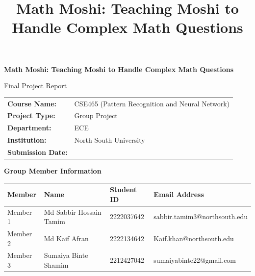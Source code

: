 \documentclass[12pt,a4paper]{article}
\title{\textbf{Math Moshi: Teaching Moshi to Handle Complex Math Questions}}
\author{}
\date{}
\begin{document}
\begin{titlepage}
\centering
{\Large \textbf{Math Moshi: Teaching Moshi to Handle Complex Math Questions}\par}
\vspace{1.2cm}

{\large Final Project Report\par}
\vspace{1cm}

\begin{tabular}{>{\bfseries}p{2.2in}p{3.8in}}
Course Name: & CSE465 (Pattern Recognition and Neural Network) \\
Project Type: & Group Project \\
Department: & ECE \\
Institution: & North South University \\
Submission Date: & \underline{\hspace{3.3in}} \\
\end{tabular}

\vspace{1.1cm}

{\large \textbf{Group Member Information}\par}
\vspace{0.4cm}

\begin{center}
\small
\begin{tabular}{|p{1.0in}|p{2.1in}|p{1.2in}|p{2.2in}|}
\hline
\textbf{Member} & \textbf{Name} & \textbf{Student ID} & \textbf{Email Address} \\
\hline
Member 1 & Md Sabbir Hossain Tamim & 2222037642 & sabbir.tamim3@northsouth.edu \\
\hline
Member 2 & Md Kaif Afran & 2222134642 & Kaif.khan@northsouth.edu \\
\hline
Member 3 & Sumaiya Binte Shamim & 2212427042 & sumaiyabinte22@gmail.com \\
\hline
\end{tabular}
\end{center}
\normalsize

\vfill
\end{titlepage}
\end{document}
